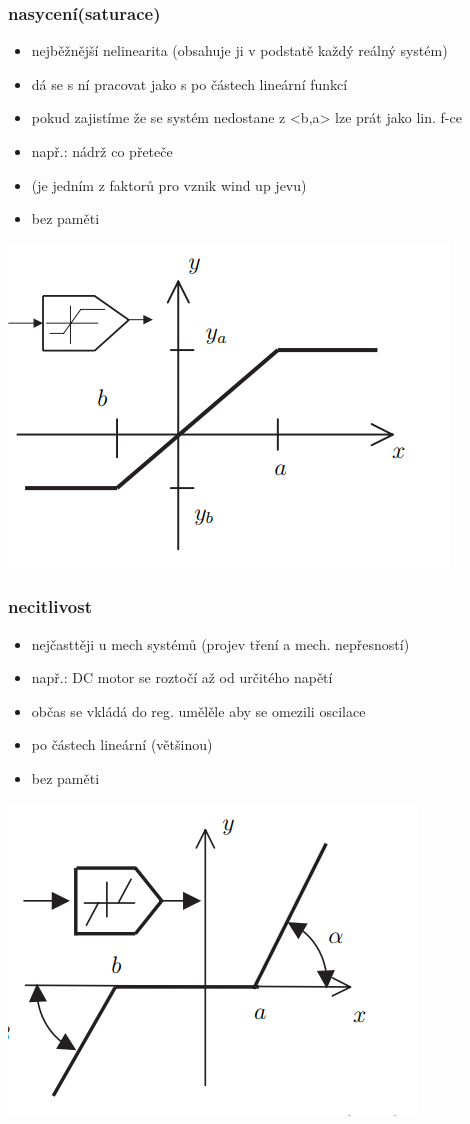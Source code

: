 \subsubsection*{nasycení(saturace)}
\begin{itemize}
    \item nejběžnější nelinearita (obsahuje ji v podstatě každý reálný systém)
    \item dá se s ní pracovat jako s po částech lineární funkcí
    \item pokud zajistíme že se systém nedostane z <b,a> lze prát jako lin. f-ce 
    \item např.: nádrž co přeteče
    \item (je jedním z faktorů pro vznik wind up jevu)
    \item bez paměti
\end{itemize}
\includegraphics[]{img/saturace.png}

\subsubsection*{necitlivost}
\begin{itemize}
    \item nejčasttěji u mech systémů (projev tření a mech. nepřesností)
    \item např.: DC motor se roztočí až od určitého napětí
    \item občas se vkládá do reg. umělěle aby se omezili oscilace
    \item po částech lineární (většinou)
    \item bez paměti
\end{itemize}
\includegraphics{img/necitlivost.png}

